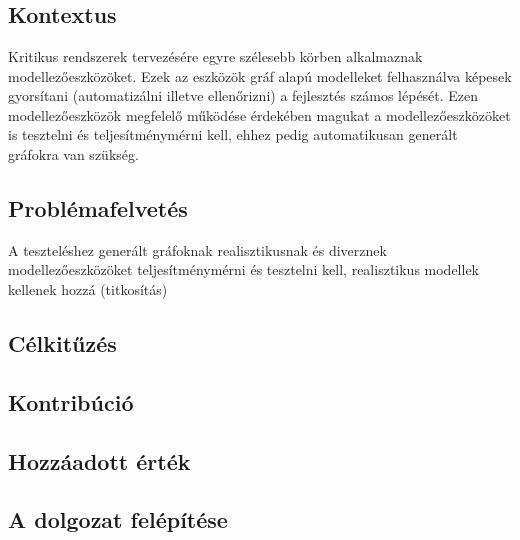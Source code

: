\chapter{\bevezetes}

\section{Kontextus}
Kritikus rendszerek tervezésére egyre szélesebb körben alkalmaznak modellezőeszközöket.
Ezek az eszközök gráf alapú modelleket felhasználva képesek gyorsítani (automatizálni illetve ellenőrizni) a fejlesztés számos lépését.
Ezen modellezőeszközök megfelelő működése érdekében magukat a modellezőeszközöket is tesztelni és teljesítménymérni kell, ehhez pedig automatikusan generált gráfokra van szükség.

\section{Problémafelvetés}
A teszteléshez generált gráfoknak realisztikusnak és diverznek
modellezőeszközöket teljesítménymérni és tesztelni kell,
realisztikus modellek kellenek hozzá (titkosítás)

\section{Célkitűzés}

\section{Kontribúció}

\section{Hozzáadott érték}

\section{A dolgozat felépítése}




